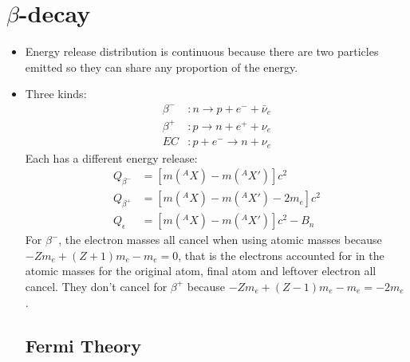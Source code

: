 \documentclass[letter]{article}
\begin{document}
\section{$\beta$-decay}
\begin{itemize}
\item Energy release distribution is continuous because there are two
  particles emitted so they can share any proportion of the
  energy.~\cite[pp. 273, Lec 19]{krane,lecture}
\item Three kinds:
  \begin{equation*}
    \begin{split}
    \beta^-&: n \to p + e^- + \bar{\nu}_e \\
    \beta^+&: p \to n + e^+ + \nu_e \\
    EC&: p + e^- \to n + \nu_e
  \end{split}
  \end{equation*}
Each has a different energy release:
\begin{equation*}
  \begin{split}
    Q_{\beta^-}&=[m(^AX)-m(^AX')]c^2 \\
    Q_{\beta^+}&=[m(^AX)-m(^AX')-2m_e]c^2\\
    Q_{\epsilon}&=[m(^AX)-m(^AX')]c^2-B_n
  \end{split}
\end{equation*}
For $\beta^-$, the electron masses all cancel when using atomic masses
because $-Zm_e+(Z+1)m_e-m_e=0$, that is the electrons accounted for in
the atomic masses for the original atom, final atom and leftover
electron all cancel. They don't cancel for $\beta^+$ because
$-Zm_e+(Z-1)m_e-m_e=-2m_e$.~\cite[pp. 274-276]{krane}

\subsection{Fermi Theory}


\end{itemize}
\end{document}
